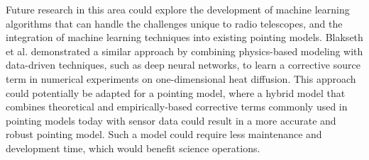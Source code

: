Future research in this area could explore the development of machine learning algorithms that can handle the challenges unique to radio telescopes, and the integration of machine learning techniques into existing pointing models.
Blakseth et al. \cite{Blakseth2022} demonstrated a similar approach by combining physics-based modeling with data-driven techniques, such as deep neural networks, to learn a corrective source term in numerical experiments on one-dimensional heat diffusion.
This approach could potentially be adapted for a pointing model, where a hybrid model that combines theoretical and empirically-based corrective terms commonly used in pointing models today with sensor data could result in a more accurate and robust pointing model.
Such a model could require less maintenance and development time, which would benefit science operations.
















